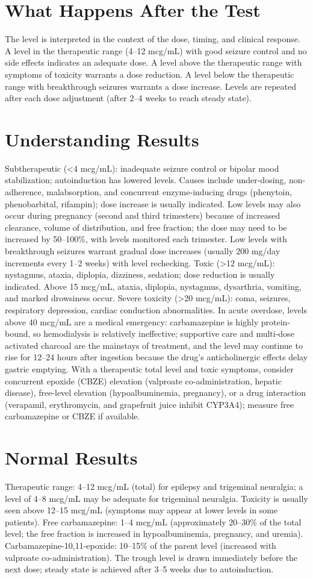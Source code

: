 \section*{What Happens After the Test}
The level is interpreted in the context of the dose, timing, and clinical response. A level in the therapeutic range (4--12 mcg/mL) with good seizure control and no side effects indicates an adequate dose. A level above the therapeutic range with symptoms of toxicity warrants a dose reduction. A level below the therapeutic range with breakthrough seizures warrants a dose increase. Levels are repeated after each dose adjustment (after 2--4 weeks to reach steady state).

\section*{Understanding Results}
Subtherapeutic (<4 mcg/mL): inadequate seizure control or bipolar mood stabilization; autoinduction has lowered levels. Causes include under-dosing, non-adherence, malabsorption, and concurrent enzyme-inducing drugs (phenytoin, phenobarbital, rifampin); dose increase is usually indicated. Low levels may also occur during pregnancy (second and third trimesters) because of increased clearance, volume of distribution, and free fraction; the dose may need to be increased by 50--100\%, with levels monitored each trimester. Low levels with breakthrough seizures warrant gradual dose increases (usually 200 mg/day increments every 1--2 weeks) with level rechecking. Toxic (>12 mcg/mL): nystagmus, ataxia, diplopia, dizziness, sedation; dose reduction is usually indicated. Above 15 mcg/mL, ataxia, diplopia, nystagmus, dysarthria, vomiting, and marked drowsiness occur. Severe toxicity (>20 mcg/mL): coma, seizures, respiratory depression, cardiac conduction abnormalities. In acute overdose, levels above 40 mcg/mL are a medical emergency: carbamazepine is highly protein-bound, so hemodialysis is relatively ineffective; supportive care and multi-dose activated charcoal are the mainstays of treatment, and the level may continue to rise for 12--24 hours after ingestion because the drug's anticholinergic effects delay gastric emptying. With a therapeutic total level and toxic symptoms, consider concurrent epoxide (CBZE) elevation (valproate co-administration, hepatic disease), free-level elevation (hypoalbuminemia, pregnancy), or a drug interaction (verapamil, erythromycin, and grapefruit juice inhibit CYP3A4); measure free carbamazepine or CBZE if available.
\section*{Normal Results}
Therapeutic range: 4--12 mcg/mL (total) for epilepsy and trigeminal neuralgia; a level of 4--8 mcg/mL may be adequate for trigeminal neuralgia. Toxicity is usually seen above 12--15 mcg/mL (symptoms may appear at lower levels in some patients). Free carbamazepine: 1--4 mcg/mL (approximately 20--30\% of the total level; the free fraction is increased in hypoalbuminemia, pregnancy, and uremia). Carbamazepine-10,11-epoxide: 10--15\% of the parent level (increased with valproate co-administration). The trough level is drawn immediately before the next dose; steady state is achieved after 3--5 weeks due to autoinduction.
